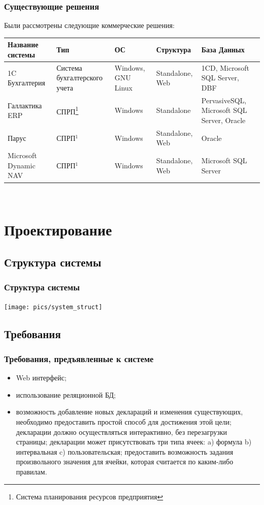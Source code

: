 \documentclass[xcolor=pdftex, dvipsnames, table]{beamer}
\begin{document}
\begin{frame}
  \frametitle{Существующие решения}
  Были рассмотрены следующие коммерческие решения:
  \begin{center}
    \small {
      \begin{tabular}{|p{2cm}|p{2cm}|p{1.5cm}|p{1.6cm}|p{2.3cm}|}\hline
        \bfseries{Название системы} &
        \bfseries{Тип} &
        \bfseries{ОС} &
        \bfseries{Структура} &
        \bfseries{База Данных}\\
        \hline
        1C Бухгалтерия & Система бухгалтерского учета & Windows, GNU Linux & Standalone, Web & 1CD, Microsoft SQL Server, DBF\\
        \hline
        Галлактика ERP & СПРП\footnote[1]{Система планирования ресурсов предприятия\label{erp}} & Windows  & Standalone  & PervasiveSQL, Microsoft SQL Server, Oracle\\
        \hline
        Парус & СПРП$^{1}$ & Windows & Standalone, Web & Oracle\\
        \hline
        Microsoft Dynamic NAV & СПРП$^{1}$ & Windows & Standalone, Web & Microsoft SQL Server\\
        \hline
      \end{tabular}
    }
  \end{center}
  \\
\end{frame}

\section{Проектирование}
\subsection{Структура системы}
\begin{frame}
  \frametitle{Структура системы}
  \begin{center}
    \texttt{[image: pics/system\_struct]}
  \end{center}
\end{frame}
\subsection{Требования}
\begin{frame}
  \frametitle{Требования, предъявленные к системе}
  \begin{itemize}
    \item Web интерфейс;
    \item использование реляционной БД;
    \item возможность добавление новых деклараций и изменения существующих, необходимо предоставить простой способ для достижения этой цели;
     декларации должно осуществляться интерактивно, без перезагрузки страницы;
     декларации может присутствовать три типа ячеек: a) формула b) интервальная c) пользовательская;
     предоставить возможность задания произвольного значения для ячейки, которая считается по каким-либо правилам.
  \end{itemize}
\end{frame}
\end{document}
